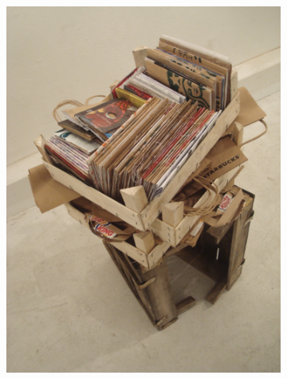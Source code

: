 \begin{figure}
    \begin{subfigure}[b]{0.48\textwidth}
        \includegraphics[width=\textwidth]{project_graphics/torun3.jpg}
    \end{subfigure}
    \hfill
    \begin{subfigure}[b]{0.48\textwidth}

\end{subfigure}
\end{figure}
